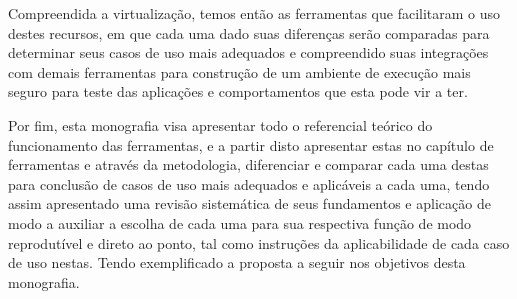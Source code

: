 Compreendida a virtualização, temos então as ferramentas que facilitaram o uso destes recursos, em que cada uma dado suas diferenças serão comparadas para determinar seus casos de uso mais adequados e compreendido suas integrações com demais ferramentas para construção de um ambiente de execução mais seguro para teste das aplicações e comportamentos que esta pode vir a ter.

Por fim, esta monografia visa apresentar todo o referencial teórico do funcionamento das ferramentas, e a partir disto apresentar estas no capítulo de ferramentas e através da metodologia, diferenciar e comparar cada uma destas para conclusão de casos de uso mais adequados e aplicáveis a cada uma, tendo assim apresentado uma revisão sistemática de seus fundamentos e aplicação de modo a auxiliar a escolha de cada uma para sua respectiva função de modo reprodutível e direto ao ponto, tal como instruções da aplicabilidade de cada caso de uso nestas. Tendo exemplificado a proposta a seguir nos objetivos desta monografia.


